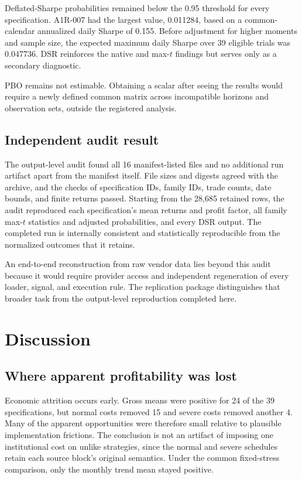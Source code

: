 Deflated-Sharpe probabilities remained below the 0.95 threshold for every specification. A1R-007 had the largest value, 0.011284, based on a common-calendar annualized daily Sharpe of 0.155. Before adjustment for higher moments and sample size, the expected maximum daily Sharpe over 39 eligible trials was 0.047736. DSR reinforces the native and max-$t$ findings but serves only as a secondary diagnostic.

PBO remains not estimable. Obtaining a scalar after seeing the results would require a newly defined common matrix across incompatible horizons and observation sets, outside the registered analysis.

\subsection{Independent audit result}\label{subsec:audit_result}

The output-level audit found all 16 manifest-listed files and no additional run artifact apart from the manifest itself. File sizes and digests agreed with the archive, and the checks of specification IDs, family IDs, trade counts, date bounds, and finite returns passed. Starting from the 28,685 retained rows, the audit reproduced each specification's mean returns and profit factor, all family max-$t$ statistics and adjusted probabilities, and every DSR output. The completed run is internally consistent and statistically reproducible from the normalized outcomes that it retains.

An end-to-end reconstruction from raw vendor data lies beyond this audit because it would require provider access and independent regeneration of every loader, signal, and execution rule. The replication package distinguishes that broader task from the output-level reproduction completed here.

\section{Discussion}\label{sec:discussion}

\subsection{Where apparent profitability was lost}

Economic attrition occurs early. Gross means were positive for 24 of the 39 specifications, but normal costs removed 15 and severe costs removed another 4. Many of the apparent opportunities were therefore small relative to plausible implementation frictions. The conclusion is not an artifact of imposing one institutional cost on unlike strategies, since the normal and severe schedules retain each source block's original semantics. Under the common fixed-stress comparison, only the monthly trend mean stayed positive.

